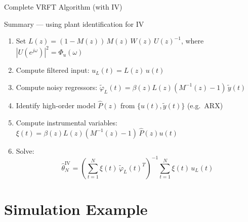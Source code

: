 \documentclass[aspectratio=169]{beamer}
\begin{document}
\begin{frame}{Complete VRFT Algorithm (with IV)}
  \begin{block}{Summary --- using plant identification for IV}
    \begin{enumerate}
      \setlength{\itemsep}{0.45em}
      \item Set $L(z) = (1-M(z))\,M(z)\,W(z)\,U(z)^{-1}$, where $|U(e^{j\omega})|^2 = \Phi_u(\omega)$
      \item Compute filtered input: $u_L(t) = L(z)\,u(t)$
      \item Compute noisy regressors: $\tilde{\varphi}_L(t) = \beta(z)L(z)(M^{-1}(z)-1)\,\tilde{y}(t)$
      \item Identify high-order model $\hat{P}(z)$ from $\{u(t),\tilde{y}(t)\}$ (e.g.\ ARX)
      \item Compute instrumental variables: $\xi(t) = \beta(z)L(z)(M^{-1}(z)-1)\,\hat{P}(z)u(t)$
      \item Solve:
        \[
          \hat{\theta}^{\mathrm{IV}}_N = \left(\sum_{t=1}^{N}\xi(t)\,\tilde{\varphi}_L(t)^T\right)^{-1}\!\sum_{t=1}^{N}\xi(t)\,u_L(t)
        \]
    \end{enumerate}
  \end{block}
\end{frame}

\section{Simulation Example}
\end{document}
